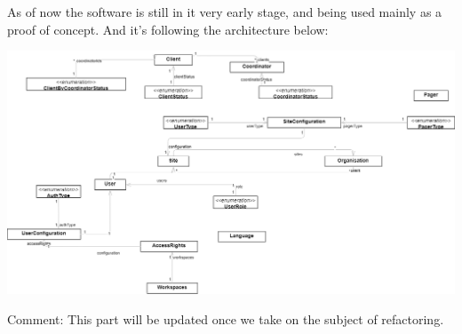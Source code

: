 As of now the software is still in it very early stage, and being used mainly as a proof of concept.
And it's following the architecture below:

\begin{center}
    \includegraphics[width=1\textwidth]{images/package.drawio}
\end{center}

Comment: This part will be updated once we take on the subject of refactoring.
